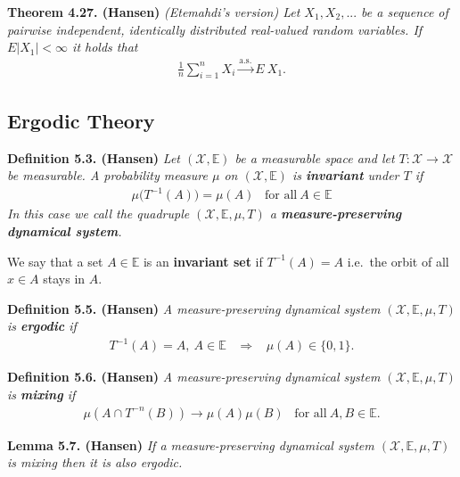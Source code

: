 \documentclass[a4paper,12pt,openany]{book}
\begin{document}
\textbf{Theorem 4.27. (Hansen)} \emph{(Etemahdi's version) Let \(X_1,X_2,...\) be a sequence of pairwise independent, identically distributed real-valued random variables. If \(E\vert X_1\vert<\infty\) it holds that}
\begin{align*}
    \frac{1}{n}\sum_{i=1}^nX_i\stackrel{\text{a.s.}}{\to} E\ X_1.\tag{4.30}
\end{align*}

\hypertarget{ergodic-theory}{%
\subsection{Ergodic Theory}\label{ergodic-theory}}

\textbf{Definition 5.3. (Hansen)} \emph{Let \((\mathcal{X},\mathbb{E})\) be a measurable space and let \(T : \mathcal{X}\to \mathcal{X}\) be measurable. A probability measure \(\mu\) on \((\mathcal{X},\mathbb{E})\) is \textbf{invariant} under \(T\) if}
\begin{align*}
    \mu\big(T^{-1}(A)\big)=\mu(A)\hspace{10pt}\text{for all}\ A\in\mathbb{E}\tag{5.5}
\end{align*}
\emph{In this case we call the quadruple \((\mathcal{X},\mathbb{E},\mu,T)\) a \textbf{measure-preserving dynamical system}.}

We say that a set \(A\in\mathbb{E}\) is an \textbf{invariant set} if \(T^{-1}(A)=A\) i.e.~the orbit of all \(x\in A\) stays in \(A\).

\textbf{Definition 5.5. (Hansen)} \emph{A measure-preserving dynamical system \((\mathcal{X},\mathbb{E},\mu,T)\) is \textbf{ergodic} if}
\begin{align*}
    T^{-1}(A)=A,\ A\in\mathbb{E} \hspace{10pt}\Rightarrow\hspace{10pt} \mu(A)\in\{0,1\}.\tag{5.7}
\end{align*}

\textbf{Definition 5.6. (Hansen)} \emph{A measure-preserving dynamical system \((\mathcal{X},\mathbb{E},\mu,T)\) is \textbf{mixing} if}
\begin{align*}
    \mu(A\cap T^{-n}(B))\to \mu(A)\mu(B)\hspace{10pt}\text{for all}\ A,B\in\mathbb{E}.\tag{5.8}
\end{align*}

\textbf{Lemma 5.7. (Hansen)} \emph{If a measure-preserving dynamical system \((\mathcal{X},\mathbb{E},\mu,T)\) is mixing then it is also ergodic.}
\end{document}
